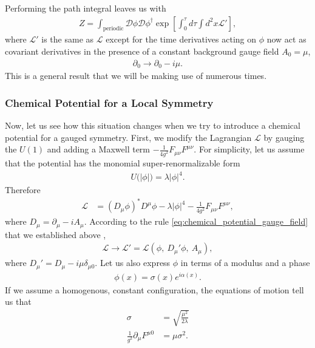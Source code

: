         Performing the path integral leaves us with
        \begin{align}
            Z= \int_{\text{periodic}} \mathcal{D}\phi \mathcal{D}\phi^{\dag} \exp \left[\int_0^{\tau} d\tau \int d^2x \mathcal{L'} \right],
        \end{align}
        where $\mathcal{L'}$ is the same as $\mathcal{L}$ except for the time derivatives acting on $\phi$ now act as covariant derivatives in the presence of a constant background gauge field $A_0=\mu$, \ie
        \begin{align}
            \partial_0 \rightarrow \partial_0 -i \mu. \label{eq:chemical_potential_gauge_field}
        \end{align}
        This is a general result that we will be making use of numerous times.
        \subsubsection{Chemical Potential for a Local Symmetry}
        Now, let us see how this situation changes when we try to introduce a chemical potential for a gauged symmetry. First, we modify the Lagrangian $\mathcal{L}$ by gauging the $U(1)$ and adding a Maxwell term $-\frac{1}{4 g^2} F_{\mu \nu} F^{\mu \nu}$. For simplicity, let us assume that the potential has the monomial super-renormalizable form
        \begin{align}
            U\big(|\phi| \big) = \lambda |\phi|^4.
        \end{align}
        Therefore
        \begin{align}
            \mathcal{L} &=( D_{\mu} \phi)^* D^{\mu} \phi - \lambda |\phi|^4 - \frac{1}{4 g^2}F_{\mu \nu} F^{\mu \nu},
        \end{align}
        where $D_{\mu}= \partial_{\mu} - i A_{\mu}$. According to the rule \ref{eq:chemical_potential_gauge_field} that we established above , 
        \begin{align}
            \mathcal{L} \rightarrow \mathcal{L}'= \mathcal{L}\left(\phi,\ D_{\mu}' \phi,\ A_{\mu} \right),
        \end{align}
        where $D_{\mu}' = D_{\mu} - i \mu \delta_{\mu 0}$.
        Let us also express $\phi$ in terms of a modulus and a phase
        \begin{align}
            \phi(x) = \sigma(x) e^{i \alpha(x)}.
        \end{align}
        If we assume a homogenous, constant configuration, the equations of motion tell us that
        \begin{align}
            \sigma &= \sqrt{\frac{\mu^2}{2\lambda}}  \label{eq:chem_pot_local_symmetry_eom1} \\
            \frac{1}{g^2} \partial_{\mu} F^{\mu 0} &= \mu \sigma^2. \label{eq:chem_pot_local_symmetry_eom2}
        \end{align}
